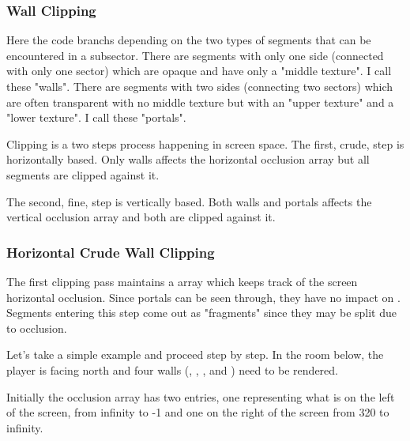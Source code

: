 \subsubsection{Wall Clipping}
Here the code branchs depending on the two types of segments that can be encountered in a subsector. There are segments with only one side (connected with only one sector) which are opaque and have only a "middle texture". I call these "walls". There are segments with two sides (connecting two sectors) which are often transparent with no middle texture but with an "upper texture" and a "lower texture". I call these "portals".\\
\par
Clipping is a two steps process happening in screen space. The first, crude, step is horizontally based. Only walls affects the horizontal occlusion array but all segments are clipped against it.\\
\par
The second, fine, step is vertically based. Both walls and portals affects the vertical occlusion array and both are clipped against it.\\
\par
\pagebreak









\subsubsection{Horizontal Crude Wall Clipping}
The first clipping pass maintains a  array which keeps track of the screen horizontal occlusion. Since portals can be seen through, they have no impact on . Segments entering this step come out as "fragments" since they may be split due to occlusion.\\
\par
{}
\par
Let's take a simple example and proceed step by step. In the room below, the player is facing north and four walls (, , , and ) need to be rendered.\\
\par
{}
\par
\vspace{-3mm}
Initially the occlusion array has two entries, one representing what is on the left of the screen, from infinity to -1 and one on the right of the screen from 320 to infinity.
\par 
\begin{minipage}{0.54\textwidth}
\vspace*{2.5mm}
\end{minipage}
\begin{minipage}{0.46\textwidth}
\end{minipage}
\par






